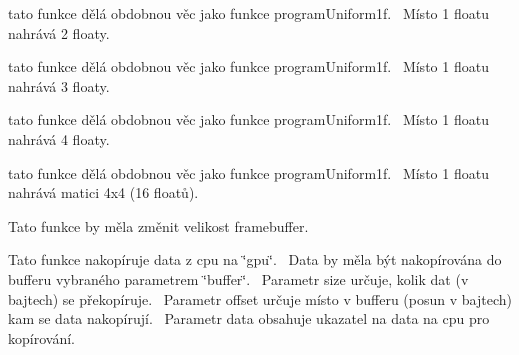 \begin{DoxyRefList}
\item[\label{todo__todo000024}%
\Hypertarget{todo__todo000024}%
Global \hyperlink{group__program__tasks_gac34e13783980686c497adda156923b1d}{G\+PU\+:\+:program\+Uniform2f} (Program\+ID prg, uint32\+\_\+t uniform\+Id, glm\+::vec2 const \&d)]tato funkce dělá obdobnou věc jako funkce program\+Uniform1f.~\newline
 Místo 1 floatu nahrává 2 floaty.  
\item[\label{todo__todo000025}%
\Hypertarget{todo__todo000025}%
Global \hyperlink{group__program__tasks_ga06b1aca1375a9cfff13d3b66defe485f}{G\+PU\+:\+:program\+Uniform3f} (Program\+ID prg, uint32\+\_\+t uniform\+Id, glm\+::vec3 const \&d)]tato funkce dělá obdobnou věc jako funkce program\+Uniform1f.~\newline
 Místo 1 floatu nahrává 3 floaty.  
\item[\label{todo__todo000026}%
\Hypertarget{todo__todo000026}%
Global \hyperlink{group__program__tasks_gad703e87e1652a78261739c6b5108c852}{G\+PU\+:\+:program\+Uniform4f} (Program\+ID prg, uint32\+\_\+t uniform\+Id, glm\+::vec4 const \&d)]tato funkce dělá obdobnou věc jako funkce program\+Uniform1f.~\newline
 Místo 1 floatu nahrává 4 floaty.  
\item[\label{todo__todo000027}%
\Hypertarget{todo__todo000027}%
Global \hyperlink{group__program__tasks_gac3b490a674226c0510ac3c0b784010fa}{G\+PU\+:\+:program\+Uniform\+Matrix4f} (Program\+ID prg, uint32\+\_\+t uniform\+Id, glm\+::mat4 const \&d)]tato funkce dělá obdobnou věc jako funkce program\+Uniform1f.~\newline
 Místo 1 floatu nahrává matici 4x4 (16 floatů).  
\item[\label{todo__todo000030}%
\Hypertarget{todo__todo000030}%
Global \hyperlink{group__framebuffer__tasks_ga6391eaf70194c39bf523ddc875ca176d}{G\+PU\+:\+:resize\+Framebuffer} (uint32\+\_\+t width, uint32\+\_\+t height)]Tato funkce by měla změnit velikost framebuffer.  
\item[\label{todo__todo000005}%
\Hypertarget{todo__todo000005}%
Global \hyperlink{group__buffer__tasks_ga97e1e76065fd913d6624b4c03164dcec}{G\+PU\+:\+:set\+Buffer\+Data} (Buffer\+ID buffer, uint64\+\_\+t offset, uint64\+\_\+t size, void const $\ast$data)]Tato funkce nakopíruje data z cpu na \char`\"{}gpu\char`\"{}.~\newline
 Data by měla být nakopírována do bufferu vybraného parametrem \char`\"{}buffer\char`\"{}.~\newline
 Parametr size určuje, kolik dat (v bajtech) se překopíruje.~\newline
 Parametr offset určuje místo v bufferu (posun v bajtech) kam se data nakopírují.~\newline
 Parametr data obsahuje ukazatel na data na cpu pro kopírování.~\newline
  

\end{DoxyRefList}
